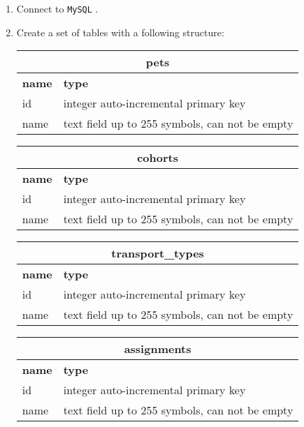 \documentclass[12pt]{article}
\newcommand{\code}[1]{\texttt{#1}}
\begin{document}
\begin{enumerate}
\item Connect to \code{MySQL} .
\item Create a set of tables with a following structure:

\begin{tabular}{| l | l | }
  \hline
  \multicolumn{2}{|c|}{\textbf{pets}}  \\
  \hline
  \textbf{name} & \textbf{type} \\
  \hline
  id & integer auto-incremental primary key \\
  name & text field up to 255 symbols, can not be empty \\
  \hline
\end{tabular}

\begin{tabular}{| l | l |}
  \hline
  \multicolumn{2}{|c|}{\textbf{cohorts}}  \\
  \hline
  \textbf{name} & \textbf{type} \\
  \hline
  id & integer auto-incremental primary key \\
  name & text field up to 255 symbols, can not be empty \\
  \hline
\end{tabular}

\begin{tabular}{| l | l |}
  \hline
  \multicolumn{2}{|c|}{\textbf{transport\_types}}  \\
  \hline
  \textbf{name} & \textbf{type} \\
  \hline
  id & integer auto-incremental primary key \\
  name & text field up to 255 symbols, can not be empty \\
  \hline
\end{tabular}

\begin{tabular}{| l | l | }
  \hline
  \multicolumn{2}{|c|}{\textbf{assignments}}  \\
  \hline
  \textbf{name} & \textbf{type} \\
  \hline
  id & integer auto-incremental primary key \\
  name & text field up to 255 symbols, can not be empty \\
  \hline
\end{tabular}


\end{enumerate}
\end{document}

